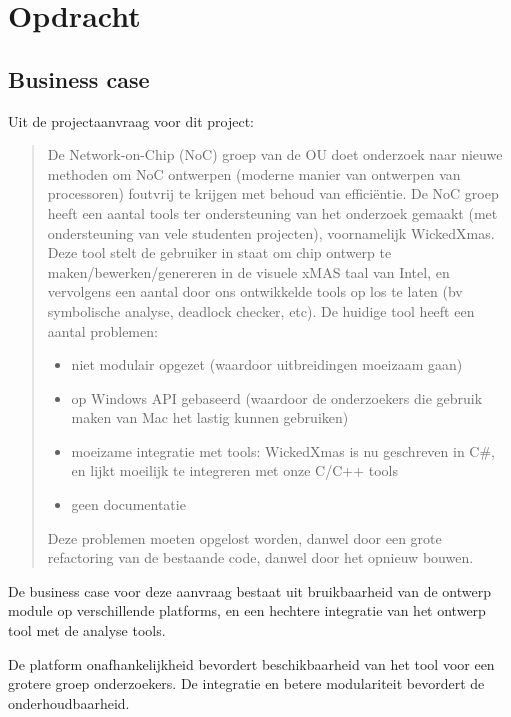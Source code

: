 
\section{Opdracht}

\subsection{Business case}

Uit de projectaanvraag voor dit project:

\begin{quote}
    \tiny
    De Network-on-Chip (NoC) groep van de OU doet onderzoek
    naar nieuwe methoden om NoC ontwerpen (moderne manier van
    ontwerpen van processoren) foutvrij te krijgen met behoud van
    efficiëntie. De NoC groep heeft een aantal tools ter ondersteuning
    van het onderzoek gemaakt (met ondersteuning van vele studenten
    projecten), voornamelijk WickedXmas. Deze tool stelt de
    gebruiker in staat om chip ontwerp te maken/bewerken/genereren
    in de visuele xMAS taal van Intel, en vervolgens een aantal door
    ons ontwikkelde tools op los te laten (bv symbolische analyse,
    deadlock checker, etc).
    De huidige tool heeft een aantal problemen:

    \begin{itemize}
	\item niet modulair opgezet (waardoor uitbreidingen moeizaam gaan)
	\item op Windows API gebaseerd (waardoor de onderzoekers die
	    gebruik maken van Mac het lastig kunnen gebruiken)
	\item moeizame integratie met tools: WickedXmas is nu geschreven
	    in C\#, en lijkt moeilijk te integreren met onze C/C++ tools
	\item geen documentatie
    \end{itemize}

    Deze problemen moeten opgelost worden, danwel door een grote
    refactoring van de bestaande code, danwel door het opnieuw
    bouwen.
\end{quote}


\noindent
De business case voor deze aanvraag bestaat uit bruikbaarheid van de ontwerp module
op verschillende platforms, en een hechtere integratie van het ontwerp tool met de
analyse tools.

De platform onafhankelijkheid bevordert beschikbaarheid van het tool voor een grotere
groep onderzoekers. De integratie en betere modulariteit bevordert de onderhoudbaarheid.

